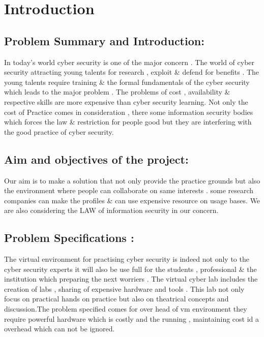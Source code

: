 \documentclass[12pt,a4paper,final,oneside]{report}
\begin{document}
\newpage
	
	\pagestyle{plain}
	\tableofcontents
	\listoffigures
	\chapter{Introduction}
	\noindent\textbf{}
	
	\section{ Problem Summary and Introduction:}
	
\noindent\textbf{} 
\par In today's world cyber security is one of the major concern . The world of cyber security  attracting young talents for research , exploit \& defend for benefits . The young talents require training \& the formal fundamentals of the cyber security which leads to the major problem . The problems of cost , availability \& respective skills are more expensive than cyber security learning. Not only the cost of Practice comes in consideration , there some information security bodies which forces the law \& restriction for people good but they are interfering with the good practice of cyber security.
	\raggedright
	\section{ Aim and objectives of the project:}
	Our aim is to make a solution that not only provide the practice grounds but also the environment where people can collaborate on same interests . some research companies can make the profiles \& can use expensive resource on usage bases. We are also considering the LAW of information security in our concern.
	
	\noindent\textbf{}
	\noindent\textbf{}
	\newpage
	\section{ Problem Specifications :}
\noindent\par The virtual environment for practising cyber security is indeed not only to the cyber security experts it will also be use full for the students , professional \& the institution which preparing the next worriers . The virtual cyber lab includes the creation of labs , sharing of  expensive hardware and tools . This lab not only focus on practical hands on practice but also on theatrical concepts and discussion.The problem specified comes for over head of vm environment they require powerful hardware which is costly and the running , maintaining cost id a overhead which can not be ignored.
\end{document}
